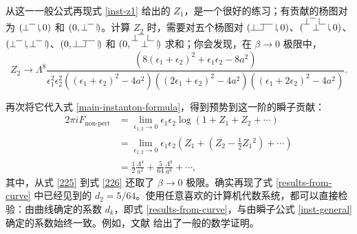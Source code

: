 从这一一般公式再现式 \eqref{inst-z1} 给出的 $Z_1$，是一个很好的练习；有贡献的杨图对为 $(\Young{1},0)$ 和 $(0,\Young{1})$。计算 $Z_2$ 时，需要对五个杨图对 $(\Young{2},0)$、$(\Young{11},0)$、$(\Young{1},\Young{1})$、$(0,\Young{2})$ 和 $(0,\Young{11})$ 求和；你会发现，在 $\beta\to0$ 极限中，
\begin{equation}
Z_2\to\Lambda^8\frac{(8(\epsilon_1+\epsilon_2)^2+\epsilon_1\epsilon_2-8a^2)}{\epsilon_1^2\epsilon_2^2((\epsilon_1+\epsilon_2)^2-4a^2)((2\epsilon_1+\epsilon_2)^2-4a^2)((\epsilon_1+2\epsilon_2)^2-4a^2)}.
\end{equation}

再次将它代入式 \eqref{main-instanton-formula}，得到预势到这一阶的瞬子贡献：
\begin{align}
2\pi iF_\text{non-pert}&=\lim_{\epsilon_{1,2}\to0}\epsilon_1\epsilon_2\log(1+Z_1+Z_2+\cdots)\\
&=\lim_{\epsilon_{1,2}\to0}\epsilon_1\epsilon_2\left(Z_1+(Z_2-\frac12Z_1{}^2)+\cdots\right)\label{225}\\
&=\frac12\frac{\Lambda^4}{a^2}+\frac5{64}\frac{\Lambda^8}{a^6}+\cdots,\label{226}
\end{align}
其中，从式 \eqref{225} 到式 \eqref{226} 还取了 $\beta\to0$ 极限。确实再现了式 \eqref{results-from-curve} 中已经见到的 $d_2=5/64$。使用任意喜欢的计算机代数系统，都可以直接检验：由曲线确定的系数 $d_k$，即式 \eqref{results-from-curve}，与由瞬子公式 \eqref{inst-general} 确定的系数始终一致。例如，文献 \cite{Nekrasov:2003rj} 给出了一般的数学证明。
